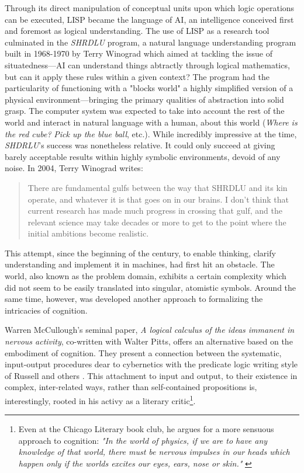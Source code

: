 Through its direct manipulation of conceptual units upon which logic operations can be executed, LISP became the language of AI, an intelligence conceived first and foremost as logical understanding. The use of LISP as a research tool culminated in the \emph{SHRDLU} program, a natural language understanding program built in 1968-1970 by Terry Winograd which aimed at tackling the issue of situatedness—AI can understand things abtractly through logical mathematics, but can it apply these rules within a given context? The program had the particularity of functioning with a "blocks world" a highly simplified version of a physical environment—bringing the primary qualities of abstraction into solid grasp. The computer system was expected to take into account the rest of the world and interact in natural language with a human, about this world (\emph{Where is the red cube?} \emph{Pick up the blue ball}, etc.). While incredibly impressive at the time, \emph{SHDRLU}'s success was nonetheless relative. It could only succeed at giving barely acceptable results within highly symbolic environments, devoid of any noise. In 2004, Terry Winograd writes:

\begin{quote}
    There are fundamental gulfs between the way that SHRDLU and its kin operate, and whatever it is that goes on in our brains. I don’t think that current research has made much progress in crossing that gulf, and the relevant science may take decades or more to get to the point where the initial ambitions become realistic.  \citep{nilsson_quest_2009}
\end{quote}

This attempt, since the beginning of the century, to enable thinking, clarify understanding and implement it in machines, had first hit an obstacle. The world, also known as the problem domain, exhibits a certain complexity which did not seem to be easily translated into singular, atomistic symbols. Around the same time, however, was developed another approach to formalizing the intricacies of cognition.

Warren McCullough's seminal paper, \emph{A logical calculus of the ideas immanent in nervous activity}, co-written with Walter Pitts, offers an alternative based on the embodiment of cognition. They present a connection between the systematic, input-output procedures dear to cybernetics with the predicate logic writing style of Russell and others \citep{mcculloch_logical_1990}. This attachment to input and output, to their existence in complex, inter-related ways, rather than self-contained propositions is, interestingly, rooted in his activy as a literary critic\footnote{Even at the Chicago Literary book club, he argues for a more sensuous approach to cognition: \emph{"In the world of physics, if we are to have any knowledge of that world, there must be nervous impulses in our heads which happen only if the worlds excites our eyes, ears, nose or skin."} \citep{mcculloch_delusion_1953}}.

